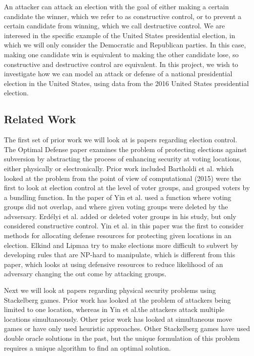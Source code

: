 \documentclass[letterpaper]{article} %
\begin{document}
An attacker can attack an election with the goal of either making a certain candidate the winner, which we refer to as constructive control, or to prevent a certain candidate from winning, which we call destructive control. We are interesed in the specific example of the United States presidential election, in which we will only consider the Democratic and Republican parties. In this case, making one candidate win is equivalent to making the other candidate lose, so constructive and destructive control are equivalent. In this project, we wish to investigate how we can model an attack or defense of a national presidential election in the United States, using data from the 2016 United States presidential election.

\subsection{Related Work}

The first set of prior work we will look at is papers regarding election control. The Optimal Defense paper examines the problem of protecting elections against subversion by abstracting the process of enhancing security at voting locations, either physically or electronically. Prior work included Bartholdi et al. which looked at the problem from the point of view of computational (2015) were the first to look at election control at the level of voter groups, and grouped voters by a bundling function. In the paper of Yin et al. used a function where voting groups did not overlap, and where given voting groups were deleted by the advsersary. Erdélyi et al. added or deleted voter groups in his study, but only considered constructive control.  Yin et al. in this paper was the first to consider methods for allocating defense resources for protecting given locations in an election. Elkind and Lipmaa try to make elections more difficult to subvert by developing rules that are NP-hard to manipulate, which is different from this paper, which looks at using defensive resources to reduce likelihood of an adversary changing the out come by attacking groups.

Next we will look at papers regarding physical security problems using Stackelberg games. Prior work has looked at the problem of attackers being limited to one location, whereas in Yin et al.the attackers attack multiple locations simultaneously. Other prior work has looked at simultaneous move games or have only used heuristic approaches. Other Stackelberg games have used double oracle solutions in the past, but the unique formulation of this problem requires a unique algorithm to find an optimal solution.
\end{document}
